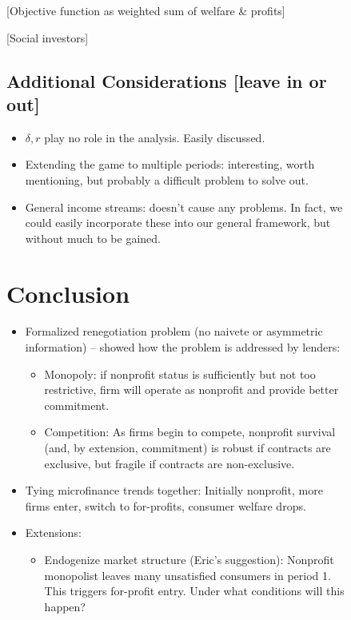 \documentclass[11pt]{article}%
\begin{document}
\begin{figure}
{[Objective function as weighted sum of welfare \& profits]

[Social investors]

\subsection{Additional Considerations [leave in or out]}

\begin{itemize}
\item $\delta,r$ play no role in the analysis. Easily discussed.

\item Extending the game to multiple periods: interesting, worth mentioning,
but probably a difficult problem to solve out.

\item General income streams: doesn't cause any problems. In fact, we could
easily incorporate these into our general framework, but without much to be gained.
\end{itemize}

\section{Conclusion}

\begin{itemize}
\item Formalized renegotiation problem (no naivete or asymmetric information)
-- showed how the problem is addressed by lenders:

\begin{itemize}
\item Monopoly: if nonprofit status is sufficiently but not too restrictive,
firm will operate as nonprofit and provide better commitment.

\item Competition: As firms begin to compete, nonprofit survival (and, by
extension, commitment) is robust if contracts are exclusive, but fragile if
contracts are non-exclusive.
\end{itemize}

\item Tying microfinance trends together: Initially nonprofit, more firms
enter, switch to for-profits, consumer welfare drops.

\item Extensions:

\begin{itemize}
\item Endogenize market structure (Eric's suggestion): Nonprofit monopolist
leaves many unsatisfied consumers in period 1. This triggers for-profit entry.
Under what conditions will this happen?


\end{itemize}
\end{itemize}}
\end{figure}
\end{document}
